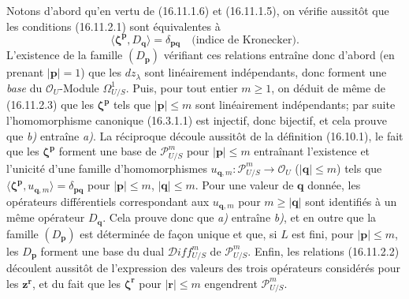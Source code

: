 Notons d'abord qu'en vertu de (16.11.1.6) et (16.11.1.5), on vérifie aussitôt
que les conditions (16.11.2.1) sont équivalentes à
\[
  \langle\boldsymbol{\zeta}^{\mathbf{p}},D_{\mathbf{q}}\rangle
  =\delta_{\mathbf{p}\mathbf{q}}
  \quad\text{(indice de Kronecker)}.
  \tag{16.11.2.3}
  \label{IV.16.11.2.3}
\]
L'existence de la famille $(D_{\mathbf{p}})$ vérifiant ces relations entraîne
donc d'abord (en prenant $|\mathbf{p}|=1$) que les $dz_\lambda$ sont
linéairement indépendants, donc forment une \emph{base} du
$\mathcal{O}_U$-Module $\varOmega_{U/S}^1$. Puis, pour tout entier $m\geq1$, on
déduit de même de (16.11.2.3) que les $\boldsymbol{\zeta}^{\mathbf{p}}$ tels
que $|\mathbf{p}|\leq m$ sont linéairement indépendants; par suite
l'homomorphisme canonique (16.3.1.1) est injectif, donc bijectif, et cela
prouve que \emph{b)} entraîne \emph{a)}. La réciproque découle aussitôt de la définition
(16.10.1), le fait que les $\boldsymbol{\zeta}^{\mathbf{p}}$ forment une base
de $\mathscr{P}_{U/S}^m$ pour $|\mathbf{p}|\leq m$ entraînant l'existence et
l'unicité d'une famille d'homomorphismes
$u_{\mathbf{q},m}:\mathscr{P}_{U/S}^m\to\mathcal{O}_U$
($|\mathbf{q}|\leq m$) tels que
$\langle\boldsymbol{\zeta}^{\mathbf{p}},u_{\mathbf{q},m}\rangle
=\delta_{\mathbf{p}\mathbf{q}}$ pour $|\mathbf{p}|\leq m$,
$|\mathbf{q}|\leq m$. Pour une valeur de $\mathbf{q}$ donnée, les opérateurs
différentiels correspondant aux $u_{\mathbf{q},m}$ pour
$m\geq|\mathbf{q}|$ sont identifiés à un même opérateur $D_{\mathbf{q}}$.
Cela prouve donc que \emph{a)} entraîne \emph{b)}, et en outre que la famille
$(D_{\mathbf{p}})$ est déterminée de façon unique et que, si $L$ est fini,
pour $|\mathbf{p}|\leq m$, les $D_{\mathbf{p}}$ forment une base du dual
$\mathscr{D}\!iff_{U/S}^m$ de $\mathscr{P}_{U/S}^m$. Enfin, les relations
(16.11.2.2) découlent aussitôt de l'expression des valeurs des trois
opérateurs considérés pour les $\mathbf{z}^{\mathbf{r}}$, et du fait que les
$\boldsymbol{\zeta}^{\mathbf{r}}$ pour $|\mathbf{r}|\leq m$ engendrent
$\mathscr{P}_{U/S}^m$.



